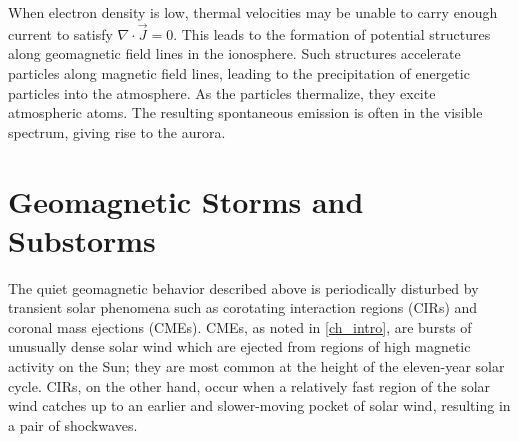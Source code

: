 When electron density is low, thermal velocities may be unable to carry enough current to satisfy $\nabla \cdot \vec{J} = 0$. This leads to the formation of potential structures along geomagnetic field lines in the ionosphere. Such structures accelerate particles along magnetic field lines, leading to the precipitation of energetic particles into the atmosphere. As the particles thermalize, they excite atmospheric atoms. The resulting spontaneous emission is often in the visible spectrum, giving rise to the aurora. 




\section{Geomagnetic Storms and Substorms}
  \label{sec_storms}

The quiet geomagnetic behavior described above is periodically disturbed by transient solar phenomena such as corotating interaction regions (CIRs) and coronal mass ejections (CMEs). CMEs, as noted in \cref{ch_intro}, are bursts of unusually dense solar wind which are ejected from regions of high magnetic activity on the Sun; they are most common at the height of the eleven-year solar cycle. CIRs, on the other hand, occur when a relatively fast region of the solar wind catches up to an earlier and slower-moving pocket of solar wind, resulting in a pair of shockwaves. 

